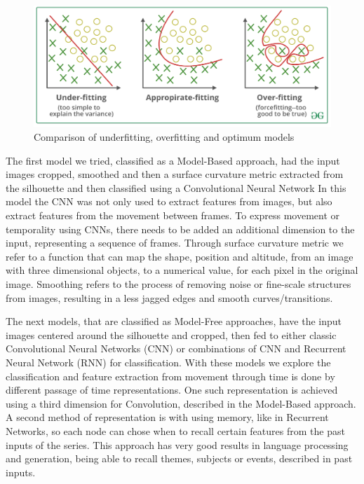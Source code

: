 \documentclass[12pt]{article}
\theoremstyle{definition}
\begin{document}
	\begin{figure}
		\includegraphics[width=\textwidth]{overfitting-example.png}
		\caption{Comparison of underfitting, overfitting and optimum models \cite{overfitting-example-image}}
		\label{figure:overfitting-example}
	\end{figure}

	The first model we tried, classified as a Model-Based approach, had the input images cropped, smoothed and then a surface curvature metric extracted from the silhouette and then classified using a Convolutional Neural Network In this model the CNN was not only used to extract features from images, but also extract features from the movement between frames. To express movement or temporality using CNNs, there needs to be added an additional dimension to the input, representing a sequence of frames. Through surface curvature metric we refer to a function that can map the shape, position and altitude, from an image with three dimensional objects, to a numerical value, for each pixel in the original image. Smoothing refers to the process of removing noise or fine-scale structures from images, resulting in a less jagged edges and smooth curves/transitions.

	The next models, that are classified as Model-Free approaches, have the input images centered around the silhouette and cropped, then fed to either classic Convolutional Neural Networks (CNN) or combinations of CNN and Recurrent Neural Network (RNN) \cite{rnn} for classification. With these models we explore the classification and feature extraction from movement through time is done by different passage of time representations. One such representation is achieved using a third dimension for Convolution, described in the Model-Based approach. A second method of representation is with using memory, like in Recurrent Networks, so each node can chose when to recall certain features from the past inputs of the series. This approach has very good results in language processing and generation, being able to recall themes, subjects or events, described in past inputs.
\end{document}
